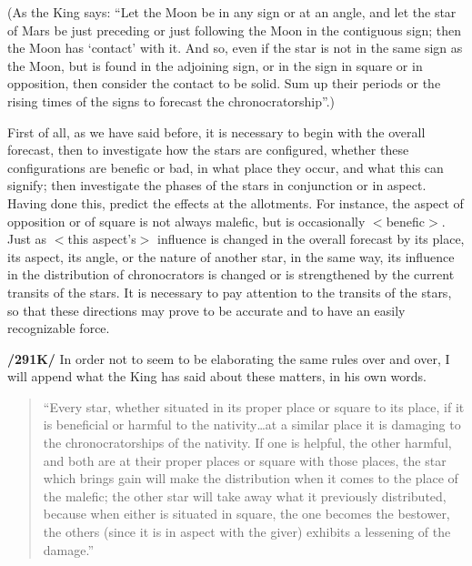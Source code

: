 (As the King says: “Let the Moon be in any sign or at an angle, and let the star of Mars be just preceding or just following the Moon in the contiguous sign; then the Moon has ‘contact’ with it. And so, even if the star is not in the same sign as the Moon, but is found in the adjoining sign, or in the sign in square or in opposition, then consider the contact to be solid. Sum up their periods or the rising times of
the signs to forecast the chronocratorship”.)

First of \mnm all, as we have said before, it is necessary to begin with the overall forecast, then to investigate how the stars are configured, whether these configurations are benefic or bad, in what place they occur, and what this can signify; then investigate the phases of the stars in conjunction or in aspect. Having done this, predict the effects at the allotments. For \mndl instance, the aspect of opposition or of square is not always malefic, but is occasionally $<$benefic$>$. Just as $<$this aspect’s$>$ influence is changed in the overall forecast by its place, its aspect, its angle, or the nature of another star, in the same way, its influence in the distribution of chronocrators is changed or is strengthened by the current transits of the stars. It is necessary to pay attention to the transits of the stars, so that these directions may prove to be accurate and to have an easily recognizable force.

\textbf{/291K/} In order not to seem to be elaborating the same rules over and over, I will append what the King has said about these matters, in his own words.
\begin{quote}
“Every star, whether situated in its proper place or square to its place, if it is beneficial or harmful to the nativity…at a similar place it is damaging to the chronocratorships of the nativity. If one is helpful, the other harmful, and both are at their proper places or square with those places, the star which brings gain will make the distribution when it comes to the place of the malefic; the other star will take away what it previously distributed, because when either is situated in square, the one becomes the bestower, the others (since it is in aspect with the giver) exhibits a lessening of the damage.”
\end{quote}

